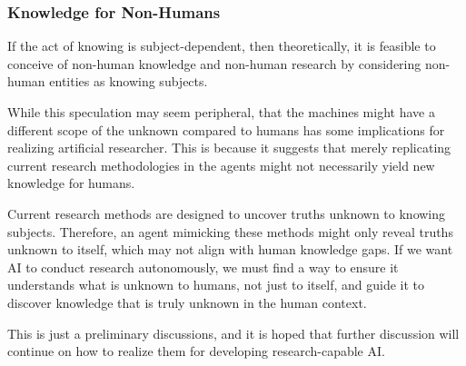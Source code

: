 \subsubsection{Knowledge for Non-Humans}
If the act of knowing is subject-dependent, then theoretically, it is feasible to conceive of non-human knowledge and non-human research by considering non-human entities as knowing subjects.

While this speculation may seem peripheral, that the machines might have a different scope of the unknown compared to humans has some implications for realizing artificial researcher. This is because it suggests that merely replicating current research methodologies in the agents might not necessarily yield new knowledge for humans.

Current research methods are designed to uncover truths unknown to knowing subjects. Therefore, an agent mimicking these methods might only reveal truths unknown to itself, which may not align with human knowledge gaps. If we want AI to conduct research autonomously, we must find a way to ensure it understands what is unknown to humans, not just to itself, and guide it to discover knowledge that is truly unknown in the human context.

This is just a preliminary discussions, and it is hoped that further discussion will continue on how to realize them for developing research-capable AI.









